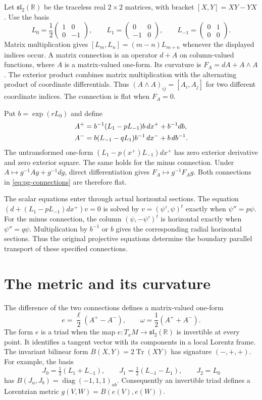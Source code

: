 Let $\mathfrak{sl}_2(\mathbb R)$ be the traceless real $2\times2$ matrices, with bracket $[X,Y]=XY-YX$.
Use the basis
\[
 L_0=\frac12\begin{pmatrix}1&0\\0&-1\end{pmatrix},\qquad
 L_1=\begin{pmatrix}0&0\\-1&0\end{pmatrix},\qquad
 L_{-1}=\begin{pmatrix}0&1\\0&0\end{pmatrix}.
\]
Matrix multiplication gives $[L_m,L_n]=(m-n)L_{m+n}$ whenever the displayed indices occur.
A matrix connection is an operator $d+A$ on column-valued functions, where $A$ is a matrix-valued one-form.
Its curvature is $F_A=dA+A\wedge A$.
The exterior product combines matrix multiplication with the alternating product of coordinate differentials.
Thus $(A\wedge A)_{ij}=[A_i,A_j]$ for two different coordinate indices.
The connection is flat when $F_A=0$.

Put $b=\exp(rL_0)$ and define
\begin{align}
 A^+&=b^{-1}(L_1-pL_{-1})b\,dx^++b^{-1}db,
       \label{eq:pg-connections}\\
 A^-&=b(L_{-1}-qL_1)b^{-1}\,dx^-+b\,db^{-1}.\notag
\end{align}
The untransformed one-form $(L_1-p(x^+)L_{-1})dx^+$ has zero exterior derivative and zero exterior square.
The same holds for the minus connection.
Under $A\mapsto g^{-1}Ag+g^{-1}dg$, direct differentiation gives
$F_A\mapsto g^{-1}F_Ag$.
Both connections in \eqref{eq:pg-connections} are therefore flat.

The scalar equations enter through actual horizontal sections.
The equation $(d+(L_1-pL_{-1})dx^+)v=0$ is solved by
$v=(\psi',\psi)^t$ exactly when $\psi''=p\psi$.
For the minus connection, the column $(\psi,-\psi')^t$ is horizontal exactly when $\psi''=q\psi$.
Multiplication by $b^{-1}$ or $b$ gives the corresponding radial horizontal sections.
Thus the original projective equations determine the boundary parallel transport of these specified connections.

\section{The metric and its curvature}

The difference of the two connections defines a matrix-valued one-form
\[
 e=\frac\ell2(A^+-A^-),\qquad
 \omega=\frac12(A^++A^-).
\]
The form $e$ is a triad when the map $e:T_xM\to\mathfrak{sl}_2(\mathbb R)$ is invertible at every point.
It identifies a tangent vector with its components in a local Lorentz frame.
The invariant bilinear form $B(X,Y)=2\operatorname{Tr}(XY)$ has signature $(-,+,+)$.
For example, the basis
\[
 J_0=\tfrac12(L_1+L_{-1}),\qquad
 J_1=\tfrac12(L_{-1}-L_1),\qquad J_2=L_0
\]
has $B(J_a,J_b)=\operatorname{diag}(-1,1,1)_{ab}$.
Consequently an invertible triad defines a Lorentzian metric
$g(V,W)=B(e(V),e(W))$.

